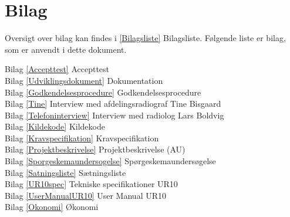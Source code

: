 \chapter{Bilag}\label{kapitel_Bilag}
Oversigt over bilag kan findes i \ref{Bilagsliste} Bilagsliste. Følgende liste er bilag, som er anvendt i dette dokument. 

Bilag \ref{Accepttest} Accepttest \\
Bilag \ref{Udviklingsdokument} Dokumentation\\
Bilag \ref{Godkendelsesprocedure} Godkendelsesprocedure \\
Bilag \ref{Tine} Interview med afdelingsradiograf Tine Bisgaard \\
Bilag \ref{Telefoninterview} Interview med radiolog Lars Boldvig \\
Bilag \ref{Kildekode} Kildekode \\
Bilag \ref{Kravspecifikation} Kravspecifikation \\
Bilag \ref{Projektbeskrivelse} Projektbeskrivelse (AU) \\
Bilag \ref{Sporgeskemaundersogelse} Spørgeskemaundersøgelse\\
Bilag \ref{Satningsliste} Sætningsliste \\
Bilag \ref{UR10spec} Tekniske specifikationer UR10 \\
Bilag \ref{UserManualUR10} User Manual UR10 \\
Bilag \ref{Okonomi} Økonomi \\



